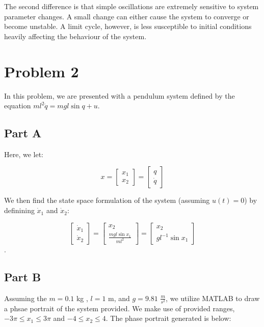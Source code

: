 \documentclass{article}
\begin{document}
The second difference is that simple oscillations are extremely sensitive to system parameter changes. A small change can either cause the system to converge or become unstable. A limit cycle, however, is less susceptible to initial conditions heavily affecting the behaviour of the system.

\section*{Problem 2}

In this problem, we are presented with a pendulum system defined by the equation $ml^2\ddot{q}=mgl\sin{q}+u$.

\subsection*{Part A}

Here, we let:

\[x = \begin{bmatrix} x_1 \\ x_2 \end{bmatrix} = \begin{bmatrix} q \\ \dot{q} \end{bmatrix}\]

We then find the state space formulation of the system (assuming $u(t)=0$) by definining $\dot{x}_1$ and $\dot{x}_2$:

\[\begin{bmatrix}\dot{x}_1\\\dot{x}_2\end{bmatrix}=\begin{bmatrix}x_2\\ \frac{mgl\sin{x_1}}{ml^2}\end{bmatrix}=\begin{bmatrix}
x_2 \\ gl^{-1}\sin{x_1}
\end{bmatrix}\].

\subsection*{Part B}

Assuming the $m=0.1$ kg , $l=1$ m, and $g=9.81$ $\frac{m}{s^2}$, we utilize MATLAB to draw a phsae portrait of the system provided. We make use of provided ranges, $-3\pi \leq x_1 \leq 3\pi$ and $-4 \leq x_2 \leq 4$. The phase portrait generated is below:
\end{document}
